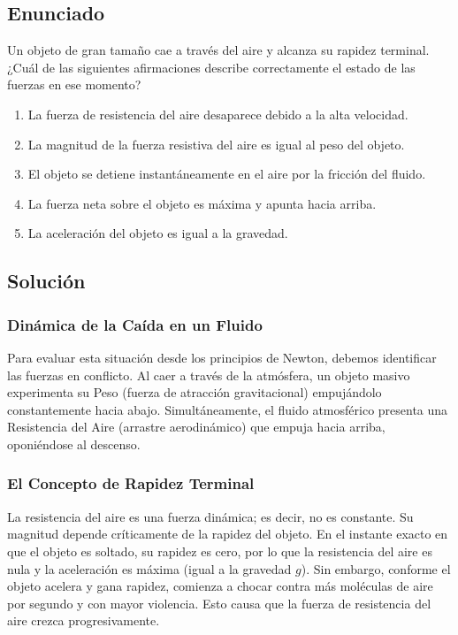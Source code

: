 \documentclass[12pt]{article}
\begin{document}
\subsection*{Enunciado}
Un objeto de gran tamaño cae a través del aire y alcanza su rapidez terminal. ¿Cuál de las siguientes afirmaciones describe correctamente el estado de las fuerzas en ese momento?
\begin{enumerate}
    \item[a)] La fuerza de resistencia del aire desaparece debido a la alta velocidad.
    \item[b)] La magnitud de la fuerza resistiva del aire es igual al peso del objeto.
    \item[c)] El objeto se detiene instantáneamente en el aire por la fricción del fluido.
    \item[d)] La fuerza neta sobre el objeto es máxima y apunta hacia arriba.
    \item[e)] La aceleración del objeto es igual a la gravedad.
\end{enumerate}

\subsection*{Solución}

\subsubsection*{Dinámica de la Caída en un Fluido}
Para evaluar esta situación desde los principios de Newton, debemos identificar las fuerzas en conflicto. Al caer a través de la atmósfera, un objeto masivo experimenta su Peso (fuerza de atracción gravitacional) empujándolo constantemente hacia abajo. Simultáneamente, el fluido atmosférico presenta una Resistencia del Aire (arrastre aerodinámico) que empuja hacia arriba, oponiéndose al descenso.

\subsubsection*{El Concepto de Rapidez Terminal}
La resistencia del aire es una fuerza dinámica; es decir, no es constante. Su magnitud depende críticamente de la rapidez del objeto. En el instante exacto en que el objeto es soltado, su rapidez es cero, por lo que la resistencia del aire es nula y la aceleración es máxima (igual a la gravedad $g$). 
Sin embargo, conforme el objeto acelera y gana rapidez, comienza a chocar contra más moléculas de aire por segundo y con mayor violencia. Esto causa que la fuerza de resistencia del aire crezca progresivamente.
\end{document}
